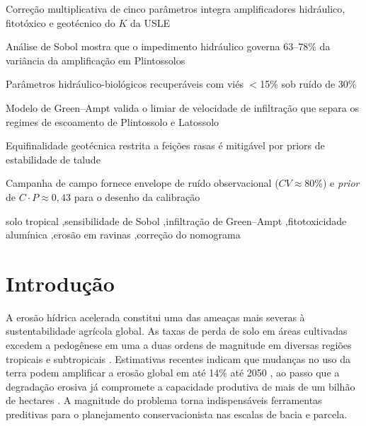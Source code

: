 \documentclass[preprint,review,12pt,authoryear]{elsarticle}
\begin{document}
\begin{frontmatter}
\begin{highlights}
\item Correção multiplicativa de cinco parâmetros integra amplificadores hidráulico, fitotóxico e geotécnico do $K$ da USLE
\item Análise de Sobol mostra que o impedimento hidráulico governa 63--78\% da variância da amplificação em Plintossolos
\item Parâmetros hidráulico-biológicos recuperáveis com viés $<$15\% sob ruído de 30\%
\item Modelo de Green--Ampt valida o limiar de velocidade de infiltração que separa os regimes de escoamento de Plintossolo e Latossolo
\item Equifinalidade geotécnica restrita a feições rasas é mitigável por priors de estabilidade de talude
\item Campanha de campo fornece envelope de ruído observacional ($CV \approx 80\%$) e \emph{prior} de $C \cdot P \approx 0,43$ para o desenho da calibração
\end{highlights}

\begin{keyword}
solo tropical \sep sensibilidade de Sobol \sep infiltração de Green--Ampt \sep fitotoxicidade alumínica \sep erosão em ravinas \sep correção do nomograma
\end{keyword}

\end{frontmatter}

\linenumbers

\section{Introdução}
\label{sec:intro}

A erosão hídrica acelerada constitui uma das ameaças mais severas à sustentabilidade agrícola global. As taxas de perda de solo em áreas cultivadas excedem a pedogênese em uma a duas ordens de magnitude em diversas regiões tropicais e subtropicais \citep{montgomery_2007}. Estimativas recentes indicam que mudanças no uso da terra podem amplificar a erosão global em até 14\% até 2050 \citep{borrelli_et_al_2017}, ao passo que a degradação erosiva já compromete a capacidade produtiva de mais de um bilhão de hectares \citep{lal_2001}. A magnitude do problema torna indispensáveis ferramentas preditivas para o planejamento conservacionista nas escalas de bacia e parcela.
\end{document}
